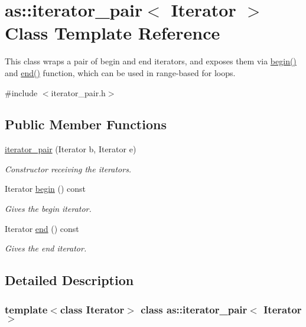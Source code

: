 \hypertarget{classas_1_1iterator__pair}{}\section{as\+:\+:iterator\+\_\+pair$<$ Iterator $>$ Class Template Reference}
\label{classas_1_1iterator__pair}


This class wraps a pair of begin and end iterators, and exposes them via \hyperlink{classas_1_1iterator__pair_a88c00afafd5ee4477b7ab2a1a89bb746}{begin()} and \hyperlink{classas_1_1iterator__pair_ae7cef6e91faecd20e6aebd2f21b29b41}{end()} function, which can be used in range-\/based for loops.  




{\ttfamily \#include $<$iterator\+\_\+pair.\+h$>$}

\subsection*{Public Member Functions}
\begin{DoxyCompactItemize}
\item 
\hyperlink{classas_1_1iterator__pair_a70030e7948493718b4baf500344a86e0}{iterator\+\_\+pair} (Iterator b, Iterator e)
\begin{DoxyCompactList}\small\item\em Constructor receiving the iterators. \end{DoxyCompactList}\item 
Iterator \hyperlink{classas_1_1iterator__pair_a88c00afafd5ee4477b7ab2a1a89bb746}{begin} () const
\begin{DoxyCompactList}\small\item\em Gives the begin iterator. \end{DoxyCompactList}\item 
Iterator \hyperlink{classas_1_1iterator__pair_ae7cef6e91faecd20e6aebd2f21b29b41}{end} () const
\begin{DoxyCompactList}\small\item\em Gives the end iterator. \end{DoxyCompactList}\end{DoxyCompactItemize}


\subsection{Detailed Description}
\subsubsection*{template$<$class Iterator$>$\newline
class as\+::iterator\+\_\+pair$<$ Iterator $>$}

